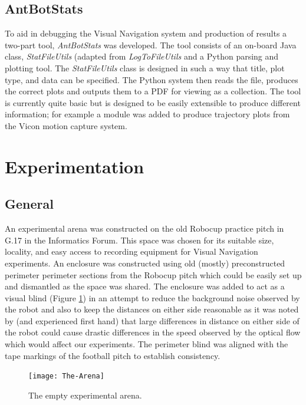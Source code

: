 \documentclass[a4paper,12pt]{article}
\begin{document}
\subsection{AntBotStats}\label{sec:abs}
To aid in debugging the Visual Navigation system and production of results a two-part tool, \textit{AntBotStats} was developed.
The tool consists of an on-board Java class, \textit{StatFileUtils} (adapted from \textit{LogToFileUtils} \cite{Zhang2017} and a
Python parsing and plotting tool. The \textit{StatFileUtils} class is designed in such a way that title, plot type, and data can be
specified. The Python system then reads the file, produces the correct plots and outputs them to a PDF for viewing as a collection.
The tool is currently quite basic but is designed to be easily extensible to produce different information; for example a module was
added to produce trajectory plots from the Vicon motion capture system. 
\newpage

\section{Experimentation}\label{sec:test}
\subsection{General}
An experimental arena was constructed on the old Robocup practice pitch in G.17 in the Informatics Forum. This space was chosen
for its suitable size, locality, and easy access to recording equipment for Visual Navigation experiments. An enclosure was constructed
using old (mostly) preconstructed perimeter perimeter sections from the Robocup pitch which could be easily set up and dismantled as the
space was shared. The enclosure was added to act as a visual blind (Figure \ref{fig:arena}) in an attempt to reduce the background noise observed by the robot and
also to keep the distances on either side reasonable as it was noted by \cite{Scimeca2017} (and experienced first hand) that large differences
in distance on either side of the robot could cause drastic differences in the speed observed by the optical flow which would affect our
experiments. The perimeter blind was aligned with the tape markings of the football pitch to establish consistency.
\newline


\begin{figure}
  \centering
  \texttt{[image: The-Arena]}
  \caption{
    \label{fig:arena} The empty experimental arena.
  }
\end{figure}
\end{document}
